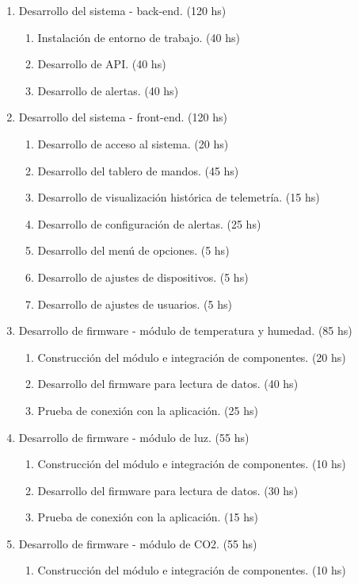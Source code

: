\documentclass[
11pt, %
]{charter}
\begin{document}
\begin{enumerate}
\begin{enumerate}
	\end{enumerate}
\item Desarrollo del sistema - back-end. (120 hs)
	\begin{enumerate}
	\item Instalación de entorno de trabajo. (40 hs)
	\item Desarrollo de API. (40 hs)
	\item Desarrollo de alertas. (40 hs)
	\end{enumerate}
\item Desarrollo del sistema - front-end. (120 hs)
	\begin{enumerate}
	\item Desarrollo de acceso al sistema. (20 hs)
	\item Desarrollo del tablero de mandos. (45 hs)
	\item Desarrollo de visualización histórica de telemetría. (15 hs)
	\item Desarrollo de configuración de alertas. (25 hs)
	\item Desarrollo del menú de opciones. (5 hs)
	\item Desarrollo de ajustes de dispositivos. (5 hs)
	\item Desarrollo de ajustes de usuarios. (5 hs)
	\end{enumerate}
\item Desarrollo de firmware - módulo de temperatura y humedad. (85 hs)
	\begin{enumerate}
	\item Construcción del módulo e integración de componentes. (20 hs)
	\item Desarrollo del firmware para lectura de datos. (40 hs)
	\item Prueba de conexión con la aplicación. (25 hs)
	\end{enumerate}
\item Desarrollo de firmware - módulo de luz. (55 hs)
	\begin{enumerate}
	\item Construcción del módulo e integración de componentes. (10 hs)
	\item Desarrollo del firmware para lectura de datos. (30 hs)
	\item Prueba de conexión con la aplicación. (15 hs)
	\end{enumerate}
\item Desarrollo de firmware - módulo de CO2. (55 hs)
	\begin{enumerate}
	\item Construcción del módulo e integración de componentes. (10 hs)

\end{enumerate}
\end{enumerate}
\end{document}
